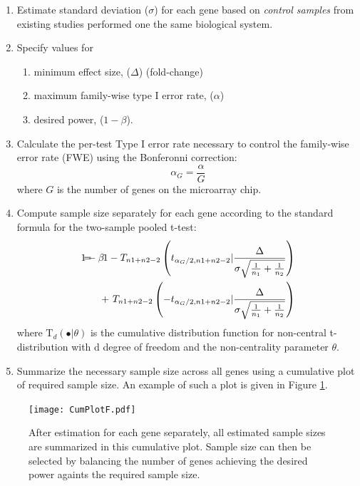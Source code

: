 \documentclass{bioinfo}
\begin{document}
\begin{enumerate}
\item{Estimate standard deviation ($\sigma$) for each gene based on
    \emph{control samples} from existing studies performed one the
    same biological system.}

\item{Specify values for
    \begin{enumerate}
    \item minimum effect size, ($\Delta$) (fold-change)
    \item maximum family-wise type I error rate, ($\alpha$) 
    \item desired power, ($1 - \beta$).
    \end{enumerate}
  }
  
\item{Calculate the per-test Type I error rate necessary to control
    the family-wise error rate (FWE) using the Bonferonni correction:}
\begin{equation}
  \alpha_G = \frac{\alpha}{G}
\end{equation}
%
where $G$ is the number of genes on the microarray chip.

\item{Compute sample size separately for each gene according to the
    standard formula for the two-sample pooled t-test:}
  \begin{eqnarray}
    \lefteqn{1-\beta} 
    &=& 1-T_{n1+n2-2} \left( t_{\alpha_G/2,n1+n2-2} | \frac{\Delta}{\sigma \sqrt{\frac{1}{n_1} + \frac{1}{n_2}}}\right) \nonumber \\
    & & +~T_{n1+n2-2} \left( -t_{\alpha_G/2,n1+n2-2} | \frac{\Delta}{\sigma \sqrt{\frac{1}{n_1} + \frac{1}{n_2}}}\right)
    \label{eq:formula}
  \end{eqnarray}
  where $\mathrm{T}_{d}(\bullet|\theta)$ is the cumulative
  distribution function for non-central t-distribution with d degree
  of freedom and the non-centrality parameter $\theta$. 
  
\item{Summarize the necessary sample size across all genes using a
    cumulative plot of required sample size. An example of such a plot
    is given in Figure \ref{fig:CumPlot}.}

\end{enumerate}

\begin{figure}[h]
  \centerline{\texttt{[image: CumPlotF.pdf]}}
  \caption[Cumulative Plot of Sample Size Calculated for All Genes]
  {After estimation for each gene separately, all estimated sample
    sizes are summarized in this cumulative plot. Sample size can then
    be selected by balancing the number of genes achieving the desired
    power againts the required sample size.}
  \label{fig:CumPlot}
\end{figure}
\end{document}

